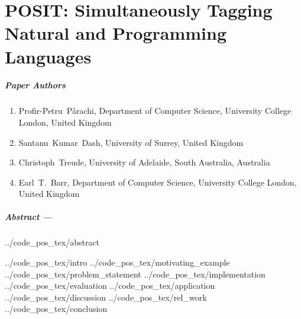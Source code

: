 \chapter{POSIT: Simultaneously Tagging Natural and Programming Languages}
\label{chapter:posit}


\renewcommand{\ourtool}{\textsc{POSIT}\xspace}
\renewcommand{\Ourtool}{\textsc{POSIT}\xspace}
\newcommand{\projurl}{\url{https://github.com/PPPI/POSIT}\xspace}


\paragraph{Paper Authors}
\begin{enumerate}
    \item[] Profir-Petru~P\^arachi, Department of Computer Science, University College London, United Kingdom
    \item[] Santanu~Kumar~Dash, University of Surrey, United Kingdom
    \item[] Christoph~Treude, University of Adelaide, South Australia, Australia
    \item[] Earl~T.~Barr, Department of Computer Science, University College London, United Kingdom
\end{enumerate}

\paragraph{Abstract ---}
{../code_pos_tex/abstract}

{../code_pos_tex/intro}
{../code_pos_tex/motivating_example}
{../code_pos_tex/problem_statement}
{../code_pos_tex/implementation}
{../code_pos_tex/evaluation}
{../code_pos_tex/application}
{../code_pos_tex/discussion}
{../code_pos_tex/rel_work}
{../code_pos_tex/conclusion}